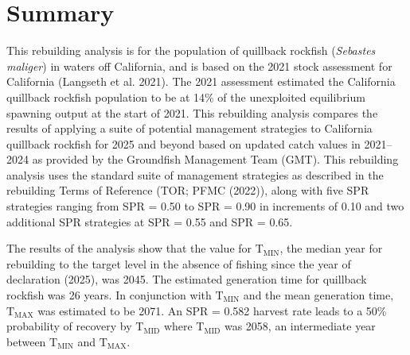 \documentclass[11pt,
  letterpaper,
]{article}
\begin{document}
\pagestyle{plain}  %
\renewcommand*{\thefootnote}{\arabic{footnote}}  %
\setcounter{footnote}{0}  %
\renewcommand{\headrulewidth}{0.5pt}
\renewcommand{\footrulewidth}{0.5pt}

\newcommand{\lt}{\ensuremath <}
\newcommand{\gt}{\ensuremath >}

\pagebreak
{}
\setcounter{page}{1}

\renewcommand{\thetable}{\roman{table}}
\renewcommand{\thefigure}{\roman{figure}}

\setlength\parskip{0.5em plus 0.1em minus 0.2em}

\pagebreak

\hypertarget{summary}{%
\section*{Summary}\label{summary}}

This rebuilding analysis is for the population of quillback rockfish (\emph{Sebastes maliger}) in waters off California, and is based on the 2021 stock assessment for California (Langseth et al. 2021). The 2021 assessment estimated the California quillback rockfish population to be at 14\% of the unexploited equilibrium spawning output at the start of 2021. This rebuilding analysis compares the results of applying a suite of potential management strategies to California quillback rockfish for 2025 and beyond based on updated catch values in 2021--2024 as provided by the Groundfish Management Team (GMT). This rebuilding analysis uses the standard suite of management strategies as described in the rebuilding Terms of Reference (TOR; PFMC (2022)), along with five SPR strategies ranging from SPR = 0.50 to SPR = 0.90 in increments of 0.10 and two additional SPR strategies at SPR = 0.55 and SPR = 0.65.

The results of the analysis show that the value for \(\text{T}_\text{MIN}\), the median year for rebuilding to the target level in the absence of fishing since the year of declaration (2025), was 2045. The estimated generation time for quillback rockfish was 26 years. In conjunction with \(\text{T}_\text{MIN}\) and the mean generation time, \(\text{T}_\text{MAX}\) was estimated to be 2071. An SPR = 0.582 harvest rate leads to a 50\% probability of recovery by \(\text{T}_\text{MID}\) where \(\text{T}_\text{MID}\) was 2058, an intermediate year between \(\text{T}_\text{MIN}\) and \(\text{T}_\text{MAX}\).
\end{document}
